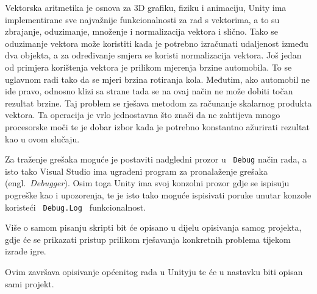 Vektorska aritmetika je osnova za 3D grafiku, fiziku i animaciju, Unity ima implementirane sve najvažnije funkcionalnosti za rad s vektorima, a to su zbrajanje, oduzimanje, množenje i normalizacija vektora i slično. Tako se oduzimanje vektora može koristiti kada je potrebno izračunati udaljenost između dva objekta, a za određivanje smjera se koristi normalizacija vektora. Još jedan od primjera korištenja vektora je prilikom mjerenja brzine automobila. To se uglavnom radi tako da se mjeri brzina rotiranja kola. Međutim, ako automobil ne ide pravo, odnosno klizi sa strane tada se na ovaj način ne može dobiti točan rezultat brzine. Taj problem se rješava metodom za računanje skalarnog produkta vektora. Ta operacija je vrlo jednostavna što znači da ne zahtijeva mnogo procesorske moči te je dobar izbor kada je potrebno konstantno ažurirati rezultat kao u ovom slučaju.

Za traženje grešaka moguće je postaviti nadgledni prozor u ~\texttt{Debug} način rada, a isto tako Visual Studio ima ugrađeni program za pronalaženje grešaka (engl.~\textit{Debugger}). Osim toga Unity ima svoj konzolni prozor gdje se ispisuju pogreške kao i upozorenja, te je isto tako moguće ispisivati poruke unutar konzole koristeći \texttt{ Debug.Log } funkcionalnost.

Više o samom pisanju skripti bit će opisano u dijelu opisivanja samog projekta, gdje će se prikazati pristup prilikom rješavanja konkretnih problema tijekom izrade igre.

Ovim završava opisivanje općenitog rada u Unityju te će u nastavku biti opisan sami projekt.
